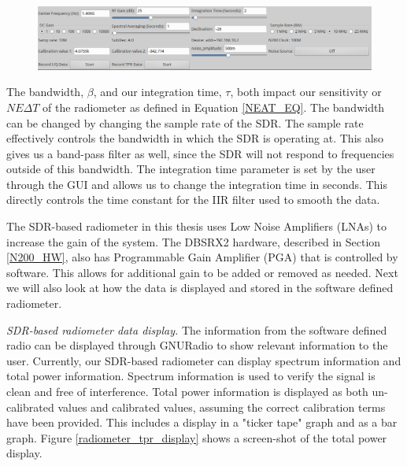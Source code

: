 {\begin{figure}[h!tb] 
\centering
\includegraphics[width=16cm]{Images/radiometer_gui.png}
\label{radiometer_gui}
\end{figure}
}

The bandwidth, $\beta$, and our integration time, $\tau$, both impact our sensitivity or $NE\Delta T$ of the radiometer as defined in Equation \ref{NEAT_EQ}.  The bandwidth can be changed by changing the sample rate of the SDR.  The sample rate effectively controls the bandwidth in which the SDR is operating at.  This also gives us a band-pass filter as well, since the SDR will not respond to frequencies outside of this bandwidth.  The integration time parameter is set by the user through the GUI and allows us to change the integration time in seconds.  This directly controls the time constant for the IIR filter used to smooth the data.

The SDR-based radiometer in this thesis uses Low Noise Amplifiers (LNAs) to increase the gain of the system.  The DBSRX2 hardware, described in Section \ref{N200_HW}, also has Programmable Gain Amplifier (PGA) that is controlled by software.  This allows for additional gain to be added or removed as needed.  Next we will also look at how the data is displayed and stored in the software defined radiometer.

\emph{SDR-based radiometer data display.}  The information from the software defined radio can be displayed through GNURadio to show relevant information to the user.  Currently, our SDR-based radiometer can display spectrum information and total power information.  Spectrum information is used to verify the signal is clean and free of interference. Total power information is displayed as both un-calibrated values and calibrated values, assuming the correct calibration terms have been provided.  This includes a display in a "ticker tape" graph and as a bar graph.  Figure \ref{radiometer_tpr_display} shows a screen-shot of the total power display.  


